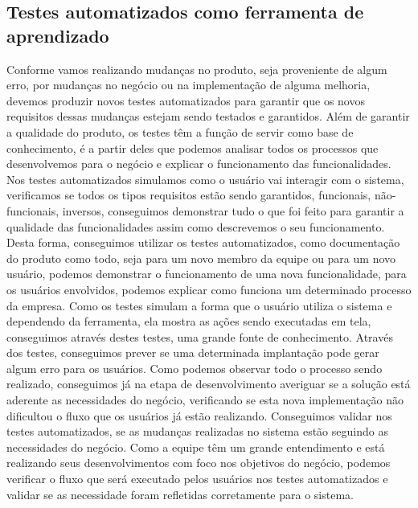     \subsection{Testes automatizados como ferramenta de aprendizado}
      Conforme vamos realizando mudanças no produto, seja proveniente de algum erro,
      por mudanças no negócio ou na implementação de alguma melhoria, devemos produzir
      novos testes automatizados para garantir que os novos requisitos dessas mudanças
      estejam sendo testados e garantidos. \newline
      Além de garantir a qualidade do produto, os testes têm a função de servir
      como base de conhecimento, é a partir deles que podemos analisar todos os
      processos que desenvolvemos para o negócio e explicar o funcionamento das
      funcionalidades. Nos testes automatizados simulamos como o usuário vai
      interagir com o sistema, verificamos se todos os tipos requisitos estão
      sendo garantidos, funcionais, não-funcionais, inversos, conseguimos demonstrar
      tudo o que foi feito para garantir a qualidade das funcionalidades assim
      como descrevemos o seu funcionamento. Desta forma, conseguimos utilizar os
      testes automatizados, como documentação do produto como todo, seja para um
      novo membro da equipe ou para um novo usuário, podemos demonstrar o funcionamento
      de uma nova funcionalidade, para os usuários envolvidos, podemos explicar
      como funciona um determinado processo da empresa. Como os testes simulam
      a forma que o usuário utiliza o sistema e dependendo da ferramenta, ela
      mostra as ações sendo executadas em tela, conseguimos através destes testes,
      uma grande fonte de conhecimento. Através dos testes, conseguimos prever se
      uma determinada implantação pode gerar algum erro para os usuários. Como
      podemos observar todo o processo sendo realizado, conseguimos já na etapa
      de desenvolvimento averiguar se a solução está aderente as necessidades do
      negócio, verificando se esta nova implementação não dificultou o fluxo que
      os usuários já estão realizando. Conseguimos validar nos testes automatizados,
      se as mudanças realizadas no sistema estão seguindo as necessidades do negócio.
      Como a equipe têm um grande entendimento e está realizando seus desenvolvimentos
      com foco nos objetivos do negócio, podemos verificar o fluxo que será executado
      pelos usuários nos testes automatizados e validar se as necessidade foram
      refletidas corretamente para o sistema. \newline
